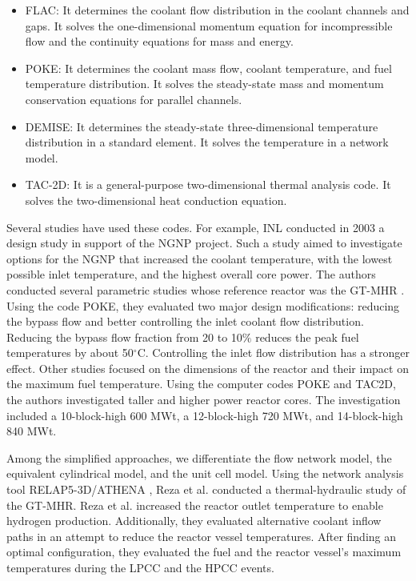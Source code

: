 \begin{itemize}
\item FLAC: It determines the coolant flow distribution in the coolant channels and gaps.
It solves the one-dimensional momentum equation for incompressible flow and the continuity equations for mass and energy.

\item POKE: It determines the coolant mass flow, coolant temperature, and fuel temperature distribution.
It solves the steady-state mass and momentum conservation equations for parallel channels.

\item DEMISE: It determines the steady-state three-dimensional temperature distribution in a standard element.
It solves the temperature in a network model.

\item TAC-2D: It is a general-purpose two-dimensional thermal analysis code.
It solves the two-dimensional heat conduction equation.
\end{itemize}

Several studies have used these codes.
For example, \gls{INL} conducted in 2003 a design study \cite{macdonald_ngnp_2003} in support of the \gls{NGNP} project.
Such a study aimed to investigate options for the NGNP that increased the coolant temperature, with the lowest possible inlet temperature, and the highest overall core power.
The authors conducted several parametric studies whose reference reactor was the GT-MHR \cite{general_atomics_gas_1996}.
Using the code POKE, they evaluated two major design modifications: reducing the bypass flow and better controlling the inlet coolant flow distribution.
Reducing the bypass flow fraction from 20 to 10$\%$ reduces the peak fuel temperatures by about 50$^{\circ}$C.
Controlling the inlet flow distribution has a stronger effect.
Other studies focused on the dimensions of the reactor and their impact on the maximum fuel temperature.
Using the computer codes POKE and TAC2D, the authors investigated taller and higher power reactor cores.
The investigation included a 10-block-high 600 MWt, a 12-block-high 720 MWt, and 14-block-high 840 MWt.

Among the simplified approaches, we differentiate the flow network model, the equivalent cylindrical model, and the unit cell model.
Using the network analysis tool RELAP5-3D/ATHENA \cite{inl_relap5-3dathena_2005}, Reza et al. \cite{reza_design_2006} conducted a thermal-hydraulic study of the GT-MHR.
Reza et al. increased the reactor outlet temperature to enable hydrogen production.
Additionally, they evaluated alternative coolant inflow paths in an attempt to reduce the reactor vessel temperatures.
After finding an optimal configuration, they evaluated the fuel and the reactor vessel's maximum temperatures during the \gls{LPCC} and the \gls{HPCC} events.

